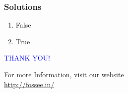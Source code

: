 \documentclass[presentation]{beamer}
\begin{document}
\begin{frame}
\frametitle{Solutions}
\label{sec-10}


\begin{enumerate}
\item False
\vspace{15pt}
\item True
\end{enumerate}
\end{frame}
\begin{frame}

  \begin{block}{}
  \begin{center}
  \textcolor{blue}{\Large THANK YOU!} 
  \end{center}
  \end{block}
\begin{block}{}
  \begin{center}
    For more Information, visit our website\\
    \url{http://fossee.in/}
  \end{center}  
  \end{block}
\end{frame}
\end{document}

